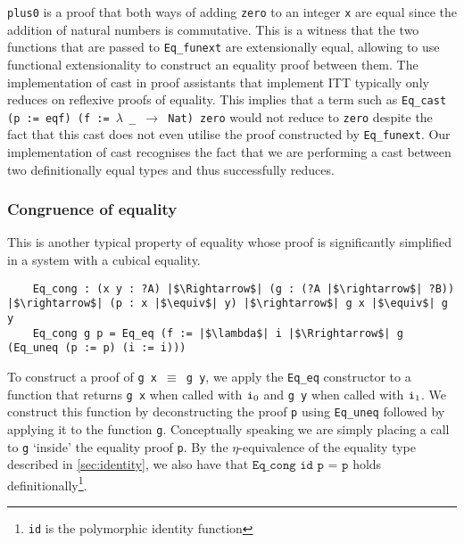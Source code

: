 \documentclass[12pt,twoside,maitrise]{dms}
\theoremstyle{definition}
\numberwithin{equation}{section}
\numberwithin{table}{chapter}
\numberwithin{figure}{chapter}
\newcommand\id[1] {\texttt{#1}}
\newcommand\fn[1] {\texttt{#1}}
\begin{document}
\id{plus0} is a proof that both ways of adding \id{zero} to an integer \id{x}
are equal since the addition of natural numbers is commutative. This is a
witness that the two functions that are passed to \id{Eq\_funext} are
extensionally equal, allowing to use functional extensionality to construct an
equality proof between them. The implementation of cast in proof assistants that
implement ITT typically only reduces on reflexive proofs of equality. This
implies that a term such as \fn{Eq\_cast (p := eqf) (f := $\lambda$ \_
  $\rightarrow$ Nat) zero} would not reduce to \id{zero} despite the fact that
this cast does not even utilise the proof constructed by \id{Eq\_funext}. Our
implementation of cast recognises the fact that we are performing a cast between
two definitionally equal types and thus successfully reduces.

\subsubsection*{Congruence of equality}\label{subsec:congruence-eq}
This is another typical property of equality whose proof is significantly
simplified in a system with a cubical equality.

\begin{verbatim}
    Eq_cong : (x y : ?A) |$\Rightarrow$| (g : (?A |$\rightarrow$| ?B)) |$\rightarrow$| (p : x |$\equiv$| y) |$\rightarrow$| g x |$\equiv$| g y
    Eq_cong g p = Eq_eq (f := |$\lambda$| i |$\Rrightarrow$| g (Eq_uneq (p := p) (i := i)))
\end{verbatim}

To construct a proof of \fn{g x $\equiv$ g y}, we apply the \id{Eq\_eq}
constructor to a function that returns \fn{g x} when called with $\ileft$ and
\fn{g y} when called with $\iright$. We construct this function by
deconstructing the proof \id{p} using \id{Eq\_uneq} followed by applying it to
the function \id{g}. Conceptually speaking we are simply placing a call to
\id{g} `inside' the equality proof \id{p}. By the $\eta$-equivalence of the
equality type described in \autoref{sec:identity}, we also have that
$\fn{Eq\_cong id p = p}$ holds definitionally\footnote{\id{id} is the
polymorphic identity function}.

\end{document}
